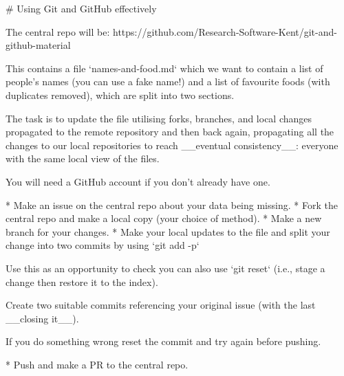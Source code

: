 # Using Git and GitHub effectively

The central repo will be: https://github.com/Research-Software-Kent/git-and-github-material

This contains a file `names-and-food.md` which we want to contain a list of people's names (you can use a fake name!) and a list of favourite foods (with duplicates removed), which are split into two sections.

The task is to update the file utilising forks, branches, and local changes propagated to the remote repository and then back again, propagating all the changes to our local repositories to reach __eventual consistency__: everyone with the same local view of the files.

You will need a GitHub account if you don't already have one.

* Make an issue on the central repo about your data being missing.
* Fork the central repo and make a local copy (your choice of method).
* Make a new branch for your changes.
* Make your local updates to the file and split your change into two commits by using `git add -p`

Use this as an opportunity to check you can also use
 `git reset` (i.e., stage a change then restore it to the index).

Create two suitable commits referencing your original issue (with
the last __closing it__).

If you do something wrong reset the commit and try again before pushing.

* Push and make a PR to the central repo.
